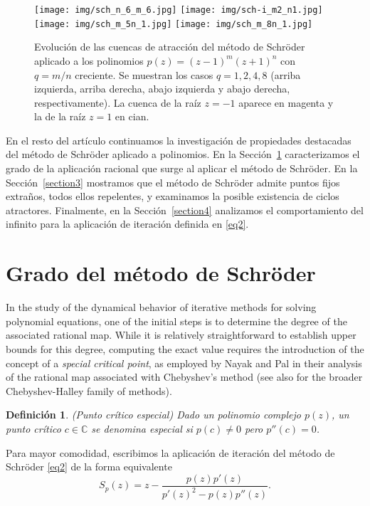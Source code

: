 \IfFileExists{aims.cls}{\documentclass{aims}}{\documentclass[11pt]{article}}
\numberwithin{equation}{section}
\newcommand{\includegraphics}[2][]{%
  }%
\renewcommand{\includegraphics}[2][]{%
  }%
\theoremstyle{thmstyleone}%
\theoremstyle{thmstyletwo}%
\theoremstyle{thmstylethree}%
\newtheorem{definition}{Definición}%
\begin{document}
\begin{figure}[ht]%
\centering
\texttt{[image: img/sch\_n\_6\_m\_6.jpg]}
\texttt{[image: img/sch-i\_m2\_n1.jpg]}
\\[\smallskipamount]
\texttt{[image: img/sch\_m\_5n\_1.jpg]}
\texttt{[image: img/sch\_m\_8n\_1.jpg]}

\caption{Evolución de las cuencas de atracción del método de Schr\"oder aplicado a los polinomios $p(z)=(z-1)^m(z+1)^n$ con $q=m/n$ creciente. Se muestran los casos $q=1, 2, 4, 8$ (arriba izquierda, arriba derecha, abajo izquierda y abajo derecha, respectivamente). La cuenca de la raíz $z=-1$ aparece en magenta y la de la raíz $z=1$ en cian.}\label{fig1}
\end{figure}

En el resto del artículo continuamos la investigación de propiedades destacadas del método de Schröder aplicado a polinomios. En la Sección~\ref{section2} caracterizamos el grado de la aplicación racional que surge al aplicar el método de Schröder. En la Sección~\ref{section3} mostramos que el método de Schröder admite puntos fijos extraños, todos ellos repelentes, y examinamos la posible existencia de ciclos atractores. Finalmente, en la Sección~\ref{section4} analizamos el comportamiento del infinito para la aplicación de iteración definida en \eqref{eq2}.

\section{Grado del método de Schr\"oder} \label{section2}

In the study of the dynamical behavior of iterative methods for solving polynomial equations, one of the initial steps is to determine the degree of the associated rational map. While it is relatively straightforward to establish upper bounds for this degree, computing the exact value requires the introduction of the concept of a \emph{special critical point}, as employed by Nayak and Pal \cite{7NP} in their analysis of the rational map associated with Chebyshev's method (see also \cite{8GGAxioms} for the broader Chebyshev-Halley family of methods).

\begin{definition} (Punto crítico especial) Dado un polinomio complejo $p(z)$, un punto crítico $c\in\mathbb{C}$ se denomina especial si $p(c)\ne 0$ pero $p''(c) = 0$.
\end{definition} 
Para mayor comodidad, escribimos la aplicación de iteración del método de Schr\"oder \eqref{eq2} de la forma equivalente
\begin{equation}\label{eq12}
S_p(z)=z -\frac{p(z)p'(z)}{p'(z)^2- p(z)p''(z)}.
\end{equation}
\end{document}
